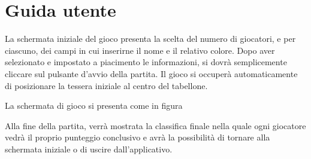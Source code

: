 \section{Guida utente}
La schermata iniziale del gioco presenta la scelta del numero di giocatori, e per ciascuno, dei campi in cui inserirne il nome e il relativo colore. Dopo aver selezionato e impostato a piacimento le informazioni, si dovrà semplicemente cliccare sul pulsante d'avvio della partita. Il gioco si occuperà automaticamente di posizionare la tessera iniziale al centro del tabellone.

La schermata di gioco si presenta come in figura


Alla fine della partita, verrà mostrata la classifica finale nella quale ogni giocatore vedrà il proprio punteggio conclusivo e avrà la possibilità di tornare alla schermata iniziale o di uscire dall'applicativo. 